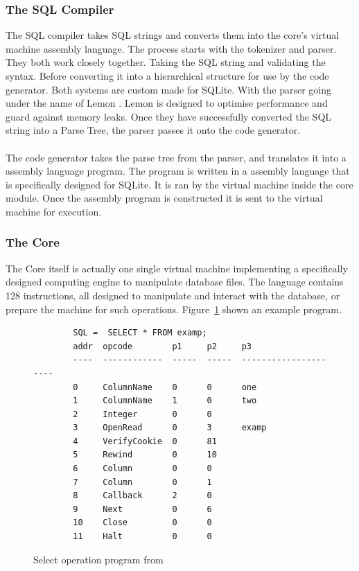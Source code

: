 \subsubsection{The SQL Compiler}
\label{subsec:how_sqlite_compiler}

The SQL compiler takes SQL strings and converts them into the core's virtual machine assembly language. The process starts with the tokenizer and parser. They both work closely together. Taking the SQL string and validating the syntax. Before converting it into a hierarchical structure for use by the code generator. Both systems are custom made for SQLite. With the parser going under the name of Lemon \citep{sqlitedefguide}. Lemon is designed to optimise performance and guard against memory leaks. Once they have successfully converted the SQL string into a Parse Tree, the parser passes it onto the code generator.
\\\\
The code generator takes the parse tree from the parser, and translates it into a assembly language program. The program is written in a assembly language that is specifically designed for SQLite. It is ran by the virtual machine inside the core module. Once the assembly program is constructed it is sent to the virtual machine for execution.

\subsubsection{The Core}
\label{subsec:how_sqlite_core}

The Core itself is actually one single virtual machine implementing a specifically designed computing engine to manipulate database files. The language contains 128 instructions, all designed to manipulate and interact with the database, or prepare the machine for such operations. Figure~\ref{fig:vm_code} shown an example program. 
\begin{figure}[H]
	\centering
	\begin{lstlisting} 
		SQL =  SELECT * FROM examp;
		addr  opcode        p1     p2     p3                                 
		----  ------------  -----  -----  ---------------------
		0     ColumnName    0      0      one                                
		1     ColumnName    1      0      two                                
		2     Integer       0      0                                         
		3     OpenRead      0      3      examp                              
		4     VerifyCookie  0      81                                        
		5     Rewind        0      10                                        
		6     Column        0      0                                         
		7     Column        0      1                                         
		8     Callback      2      0                                         
		9     Next          0      6                                         
		10    Close         0      0                                         
		11    Halt          0      0
	\end{lstlisting}
	\caption{Select operation program from \cite{sqlite}}
	\label{fig:vm_code}
\end{figure}

